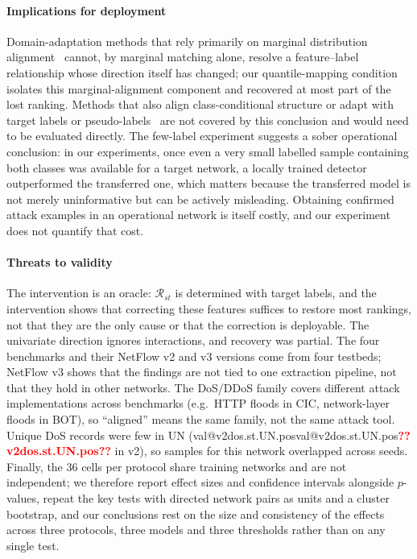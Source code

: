\documentclass[preprint,12pt]{elsarticle}
\makeatletter
\newcommand{\val}[1]{\ifcsname val@#1\endcsname\csname val@#1\endcsname\else\textbf{\textcolor{red}{??#1??}}\fi}
\newcommand{\net}[1]{\textsc{#1}}
\makeatother
\begin{document}
\paragraph{Implications for deployment}
Domain-adaptation methods that rely primarily on marginal distribution alignment~\cite{sun2016return} cannot, by marginal matching alone, resolve a feature--label relationship whose direction itself has changed; our quantile-mapping condition isolates this marginal-alignment component and recovered at most part of the lost ranking. Methods that also align class-conditional structure or adapt with target labels or pseudo-labels~\cite{ganin2016domain} are not covered by this conclusion and would need to be evaluated directly. The few-label experiment suggests a sober operational conclusion: in our experiments, once even a very small labelled sample containing both classes was available for a target network, a locally trained detector outperformed the transferred one, which matters because the transferred model is not merely uninformative but can be actively misleading. Obtaining confirmed attack examples in an operational network is itself costly, and our experiment does not quantify that cost.

\paragraph{Threats to validity}
The intervention is an oracle: $\mathcal{R}_{st}$ is determined with target labels, and the intervention shows that correcting these features suffices to restore most rankings, not that they are the only cause or that the correction is deployable. The univariate direction ignores interactions, and recovery was partial. The four benchmarks and their NetFlow v2 and v3 versions come from four testbeds; NetFlow v3 shows that the findings are not tied to one extraction pipeline, not that they hold in other networks. The DoS/DDoS family covers different attack implementations across benchmarks (e.g.\ HTTP floods in \net{CIC}, network-layer floods in \net{BOT}), so ``aligned'' means the same family, not the same attack tool. Unique DoS records were few in \net{UN} (\val{v2dos.st.UN.pos} in v2), so samples for this network overlapped across seeds. Finally, the 36 cells per protocol share training networks and are not independent; we therefore report effect sizes and confidence intervals alongside $p$-values, repeat the key tests with directed network pairs as units and a cluster bootstrap, and our conclusions rest on the size and consistency of the effects across three protocols, three models and three thresholds rather than on any single test.
\end{document}
